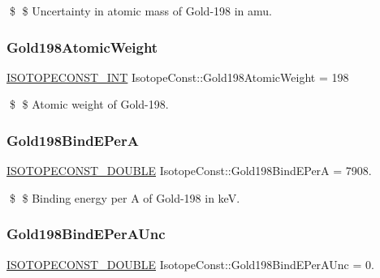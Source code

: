 \$ \$ Uncertainty in atomic mass of Gold-\/198 in amu. \mbox{\label{group___isotope_const-_gold-_au198_gacca4f14518a42292e72512772fc22685}} 
\subsubsection{\texorpdfstring{Gold198\+Atomic\+Weight}{Gold198AtomicWeight}}
{\footnotesize\ttfamily \mbox{\hyperlink{group___isotope_const-_macros_ga5f18360b3e99483a35c32d789e62621c}{I\+S\+O\+T\+O\+P\+E\+C\+O\+N\+S\+T\+\_\+\+I\+NT}} Isotope\+Const\+::\+Gold198\+Atomic\+Weight = 198}

\$ \$ Atomic weight of Gold-\/198. \mbox{\label{group___isotope_const-_gold-_au198_ga2f324c759367692641c22c6054acd054}} 
\subsubsection{\texorpdfstring{Gold198\+Bind\+E\+PerA}{Gold198BindEPerA}}
{\footnotesize\ttfamily \mbox{\hyperlink{group___isotope_const-_macros_ga8f45a7272ce02c0b4c65c44636ed719a}{I\+S\+O\+T\+O\+P\+E\+C\+O\+N\+S\+T\+\_\+\+D\+O\+U\+B\+LE}} Isotope\+Const\+::\+Gold198\+Bind\+E\+PerA = 7908.}

\$ \$ Binding energy per A of Gold-\/198 in keV. \mbox{\label{group___isotope_const-_gold-_au198_ga61fe9aca78cf993375089478424e1aba}} 
\subsubsection{\texorpdfstring{Gold198\+Bind\+E\+Per\+A\+Unc}{Gold198BindEPerAUnc}}
{\footnotesize\ttfamily \mbox{\hyperlink{group___isotope_const-_macros_ga8f45a7272ce02c0b4c65c44636ed719a}{I\+S\+O\+T\+O\+P\+E\+C\+O\+N\+S\+T\+\_\+\+D\+O\+U\+B\+LE}} Isotope\+Const\+::\+Gold198\+Bind\+E\+Per\+A\+Unc = 0.}

